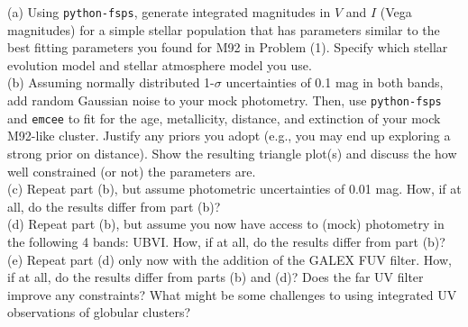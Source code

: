 \documentclass{article}
\begin{document}
(a) Using \texttt{python-fsps}, generate integrated magnitudes in $V$ and $I$ (Vega magnitudes) for a simple stellar population that has parameters similar to the best fitting parameters you found for M92  in  Problem (1).  Specify which stellar evolution model and stellar atmosphere model you use. \\

(b) Assuming normally distributed 1-$\sigma$ uncertainties of 0.1 mag in both bands, add random Gaussian noise to your mock photometry.  Then, use \texttt{python-fsps} and \texttt{emcee} to fit for the age, metallicity, distance, and extinction of your mock M92-like cluster.  Justify any priors you adopt (e.g., you may end up exploring a strong prior on distance).  Show the resulting triangle plot(s) and discuss the how well constrained (or not) the parameters are.  \\

(c) Repeat part (b), but assume photometric uncertainties of 0.01 mag.  How, if at all, do the results differ from part (b)? \\

(d) Repeat part (b), but assume you now have access to (mock) photometry in the following 4 bands: UBVI.  How, if at all, do the results differ from part (b)? \\

(e) Repeat part (d) only now with the addition of the GALEX FUV filter.  How, if at all, do the results differ from parts (b) and (d)?  Does the far UV filter improve any constraints? What might be some challenges to using integrated UV observations of globular clusters? \\
\end{document}
